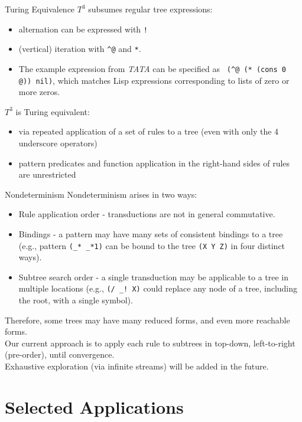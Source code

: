 \documentclass[8pt]{beamer}
\begin{document}
\begin{frame}{Turing Equivalence}
$T^3$ subsumes regular tree expressions:
\begin{itemize}
\item  alternation can be expressed with \texttt{!} 
\item (vertical) iteration with \texttt{\^{}@} and \texttt{*}. 
\item The example expression from \emph{TATA} can be specified as \texttt{ (\^{}@ (* (cons 0 @)) nil)}, which matches Lisp expressions corresponding to lists of zero or more zeros. 
\end{itemize} 


$T^3$ is Turing equivalent:\\
\begin{itemize} 
\item via repeated application of a set of rules to a tree (even with only the 4 underscore operators)
\item pattern predicates and function application in the right-hand sides of rules are unrestricted
\end{itemize}
\end{frame}
\begin{frame}{Nondeterminism}
  Nondeterminism arises in two ways:
  \begin{itemize}
  \item Rule application order - transductions are not in general commutative.
  \item Bindings  - a pattern may have many sets of consistent bindings to a tree (e.g., pattern \texttt{(\_* \_*1)} can be bound to the tree \texttt{(X Y Z)} in four distinct ways). 
  \item Subtree search order - a single transduction may be applicable to a tree in multiple locations (e.g., \texttt{(/ \_!~X)} could replace any node of a tree, including the root, with a single symbol).
  \end{itemize}
  Therefore, some trees may have many reduced forms, and even more reachable forms. \\
  
  Our current approach is to apply each rule to subtrees in top-down, left-to-right (pre-order), until convergence. \\

  Exhaustive exploration (via infinite streams) will be added in the future. 
\end{frame}

\section{Selected Applications}
\end{document}
